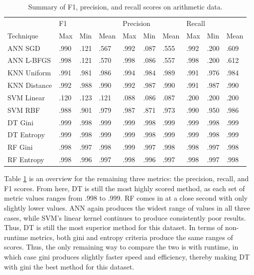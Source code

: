 \documentclass[12pt]{uthesis-v12}  %
\begin{document}
\begin{table}[!t]
\caption{Summary of F1, precision, and recall scores on arithmetic data.}
\renewcommand{\arraystretch}{1.3}
\centering
{\begin{tabular}{*{10}{l}}
\toprule
& \multicolumn{3}{l}{F1} & \multicolumn{3}{l}{Precision} & \multicolumn{3}{l}{Recall} \\
Technique & Max & Min & Mean & Max & Min & Mean & Max & Min & Mean \\ \midrule
ANN SGD & .990 & .121 & .567 & .992 & .087 & .555 & .992 & .200 & .609 \\
ANN L-BFGS & .998 & .121 & .570 & .998 & .086 & .557 & .998 & .200 & .612 \\
KNN Uniform & .991 & .981 & .986 & .994 & .984 & .989 & .991 & .976 & .984 \\
KNN Distance & .992 & .988 & .990 & .992 & .987 & .990 & .991 & .987 & .990 \\
SVM Linear & .120 & .123 & .121 & .088 & .086 & .087 & .200 & .200 & .200 \\
SVM RBF & .988 & .901 & .979 & .987 & .871 & .973 & .990 & .950 & .986 \\
DT Gini & .999 & .998 & .999 & .999 & .998 & .999 & .999 & .998 & .999 \\
DT Entropy & .999 & .998 & .999 & .999 & .998 & .999 & .999 & .998 & .999 \\
RF Gini & .998 & .997 & .998 & .999 & .997 & .998 & .998 & .997 & .998 \\
RF Entropy & .998 & .996 & .997 & .998 & .996 & .997 & .998 & .997 & .998 \\ \bottomrule
\end{tabular}}

\label{fpr-nata}
\end{table}

Table \ref{fpr-nata} is an overview for the remaining three metrics: the precision, recall, and F1 scores. From here, DT is still the most highly scored method, as each set of metric values ranges from .998 to .999. RF comes in at a close second with only slightly lower values. ANN again produces the widest range of values in all three cases, while SVM's linear kernel continues to produce consistently poor results. Thus, DT is still the most superior method for this dataset. In terms of non-runtime metrics, both gini and entropy criteria produce the same ranges of scores. Thus, the only remaining way to compare the two is with runtime, in which case gini produces slightly faster speed and efficiency, thereby making DT with gini the best method for this dataset.
\end{document}

